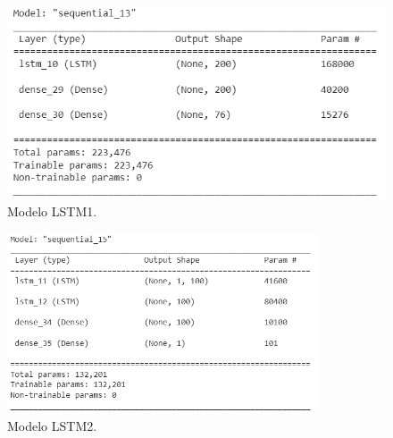   \begin{figure}[h!]
      \begin{center}
        \includegraphics[height=2.in]{Figures/Red_LSTM.PNG}
        \caption{ Modelo LSTM1.}
        \label{Red_LSTM1}
      \end{center}
    \end{figure}
  
    \begin{figure}[h!]
        \begin{center}
          \includegraphics[height=2.1in]{Figures/Red_LSTM2.PNG}
          \caption{ Modelo LSTM2.}
          \label{Red_LSTM2}
        \end{center}
      \end{figure}
    
    

     
     




